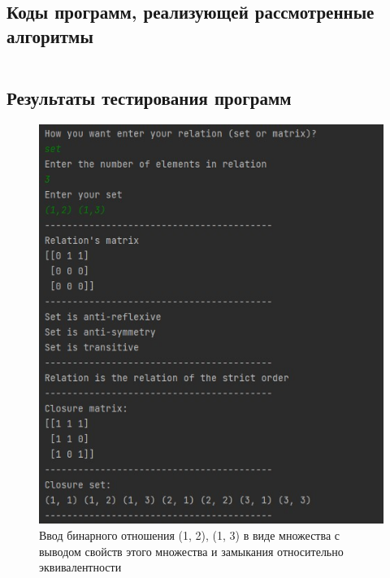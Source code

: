 \documentclass[spec, och, labwork]{shiza}
\begin{document}
        \subsection{Коды программ, реализующей рассмотренные алгоритмы}

            \inputminted[fontsize=\small]{python}{../code/lab1.py}
    
        \subsection{Результаты тестирования программ}

        \begin{figure}[H]
            \centering      %
            \includegraphics[width=1.\textwidth]{1}
            \caption{Ввод бинарного отношения {(1, 2), (1, 3)} в виде множества с выводом свойств этого множества и замыкания относительно эквивалентности}
            \label{fig:image1}
        \end{figure}
        
\end{document}
